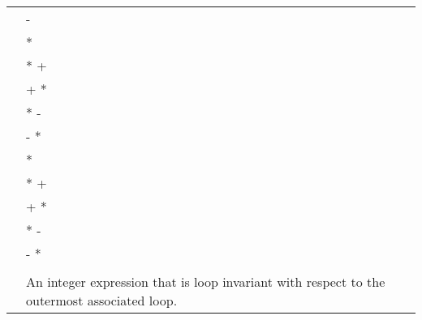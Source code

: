 \begin{ccppspecific}
\begin{supertabular}{ p{0.8in} p{4.5in}}
    & {} - {} \\
    & {} {*} {} \\
    & {} {*} {} + {} \\
    & {} + {} {*} {} \\
    & {} {*} {} - {} \\
    & {} - {} {*} {} \\
    & {} {*} {} \\
    & {} {*} {} + {} \\
    & {} + {} {*} {} \\
    & {} {*} {} - {} \\
    & {} - {} {*} {} \\
    & \\
    {} & An integer expression that is loop invariant with respect
    to the outermost associated loop.\\
\end{supertabular}
\medskip

\end{ccppspecific}

